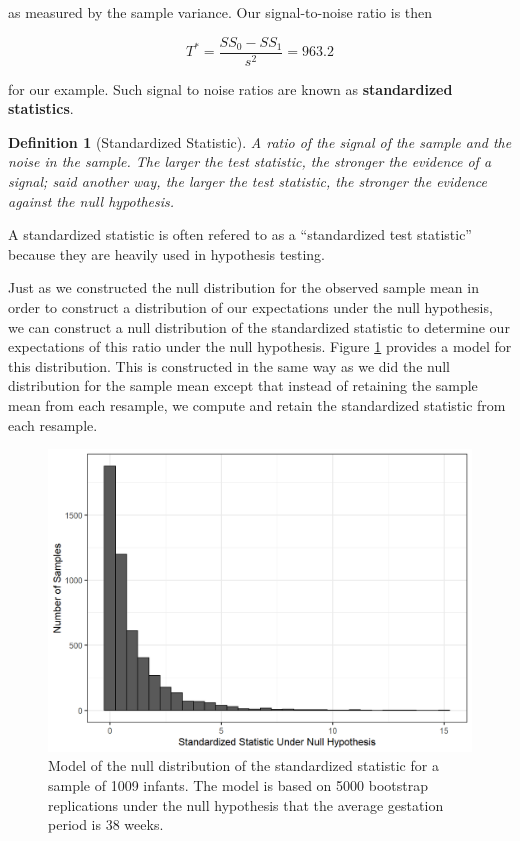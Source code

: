 \documentclass[
]{book}
\theoremstyle{plain}
\theoremstyle{mydefn}
\newtheorem{definition}{Definition}[chapter]
\theoremstyle{myexmpl}
\theoremstyle{remark}
\begin{document}
as measured by the sample variance. Our signal-to-noise ratio is then

\[T^* = \frac{SS_0 - SS_1}{s^2} = 963.2\]

for our example. Such signal to noise ratios are known as \textbf{standardized statistics}.

\begin{definition}[Standardized Statistic]
\protect\hypertarget{def:defn-standardized-test-statistic}{}{\label{def:defn-standardized-test-statistic} {} }A ratio of the signal of the sample and the noise in the sample. The larger the test statistic, the stronger the evidence of a signal; said another way, the larger the test statistic, the stronger the evidence against the null hypothesis.
\end{definition}

\begin{rmdtip}
A standardized statistic is often refered to as a ``standardized test statistic'' because they are heavily used in hypothesis testing.
\end{rmdtip}

Just as we constructed the null distribution for the observed sample mean in order to construct a distribution of our expectations under the null hypothesis, we can construct a null distribution of the standardized statistic to determine our expectations of this ratio under the null hypothesis. Figure \ref{fig:singleteststat-null} provides a model for this distribution. This is constructed in the same way as we did the null distribution for the sample mean except that instead of retaining the sample mean from each resample, we compute and retain the standardized statistic from each resample.

\begin{figure}

{\centering \includegraphics[width=0.8\linewidth]{./Images/singleteststat-null-1} 

}

\caption{Model of the null distribution of the standardized statistic for a sample of 1009 infants. The model is based on 5000 bootstrap replications under the null hypothesis that the average gestation period is 38 weeks.}\label{fig:singleteststat-null}
\end{figure}
\end{document}

